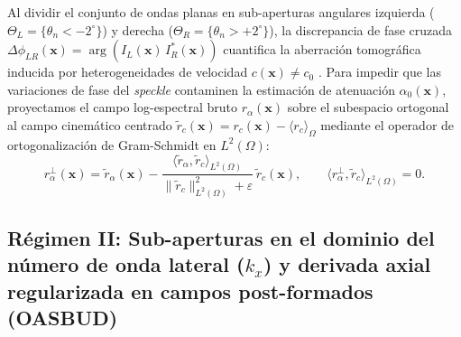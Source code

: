 \documentclass[9pt]{article}
\begin{document}
Al dividir el conjunto de ondas planas en sub-aperturas angulares izquierda ($\Theta_L = \{\theta_n < -2^\circ\}$) y derecha ($\Theta_R = \{\theta_n > +2^\circ\}$), la discrepancia de fase cruzada $\Delta\phi_{LR}(\mathbf{x}) = \arg\!\left(I_L(\mathbf{x})\,I_R^*(\mathbf{x})\right)$ cuantifica la aberración tomográfica inducida por heterogeneidades de velocidad $c(\mathbf{x}) \neq c_0$ \parencite{Jaeger2015, Stahli2020}. Para impedir que las variaciones de fase del \textit{speckle} contaminen la estimación de atenuación $\alpha_0(\mathbf{x})$, proyectamos el campo log-espectral bruto $r_\alpha(\mathbf{x})$ sobre el subespacio ortogonal al campo cinemático centrado $\tilde{r}_c(\mathbf{x}) = r_c(\mathbf{x}) - \langle r_c\rangle_\Omega$ mediante el operador de ortogonalización de Gram-Schmidt en $L^2(\Omega)$:
\begin{equation}
r_\alpha^{\perp}(\mathbf{x}) = \tilde{r}_\alpha(\mathbf{x}) - \frac{\langle \tilde{r}_\alpha, \tilde{r}_c\rangle_{L^2(\Omega)}}{\lVert \tilde{r}_c\rVert_{L^2(\Omega)}^2 + \varepsilon}\,\tilde{r}_c(\mathbf{x}), \qquad \langle r_\alpha^{\perp}, \tilde{r}_c\rangle_{L^2(\Omega)} = 0.
\label{eq:gram_schmidt}
\end{equation}

\subsection{Régimen II: Sub-aperturas en el dominio del número de onda lateral \texorpdfstring{($k_x$)}{(kx)} y derivada axial regularizada en campos post-formados (OASBUD)}
\label{subsec:regimen_oasbud}
\end{document}
